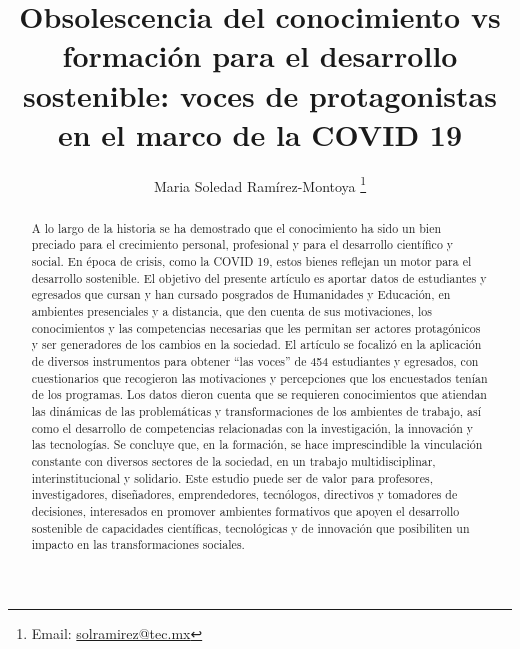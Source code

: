 \documentclass[spanish]{textolivre}
\title{Obsolescencia del conocimiento vs formación para el desarrollo sostenible: voces de protagonistas en el marco de la COVID 19}
\author[1]{Maria Soledad Ramírez-Montoya \orcid{0000-0002-1274-706X} \thanks{Email: \url{solramirez@tec.mx}}}
\affil[1]{Tecnologico de Monterrey, Escuela de Humanidades y Educación, Departamento de Educación, Monterrey, México.}
\begin{document}
\maketitle

\begin{polyabstract}
\begin{abstract}
A lo largo de la historia se ha demostrado que el conocimiento ha sido un bien preciado para el crecimiento personal, profesional y para el desarrollo científico y social. En época de crisis, como la COVID 19, estos bienes reflejan un motor para el desarrollo sostenible. El objetivo del presente artículo es aportar datos de estudiantes y egresados que cursan y han cursado posgrados de Humanidades y Educación, en ambientes presenciales y a distancia, que den cuenta de sus motivaciones, los conocimientos y las competencias necesarias que les permitan ser actores protagónicos y ser generadores de los cambios en la sociedad. El artículo se focalizó en la aplicación de diversos instrumentos para obtener “las voces” de 454 estudiantes y egresados, con cuestionarios que recogieron las motivaciones y percepciones que los encuestados tenían de los programas. Los datos dieron cuenta que se requieren conocimientos que atiendan las dinámicas de las problemáticas y transformaciones de los ambientes de trabajo, así como el desarrollo de competencias relacionadas con la investigación, la innovación y las tecnologías. Se concluye que, en la formación, se hace imprescindible la vinculación constante con diversos sectores de la sociedad, en un trabajo multidisciplinar, interinstitucional y solidario. Este estudio puede ser de valor para profesores, investigadores, diseñadores, emprendedores, tecnólogos, directivos y tomadores de decisiones, interesados en promover ambientes formativos que apoyen el desarrollo sostenible de capacidades científicas, tecnológicas y de innovación que posibiliten un impacto en las transformaciones sociales.

\end{abstract}


\end{polyabstract}
\end{document}
